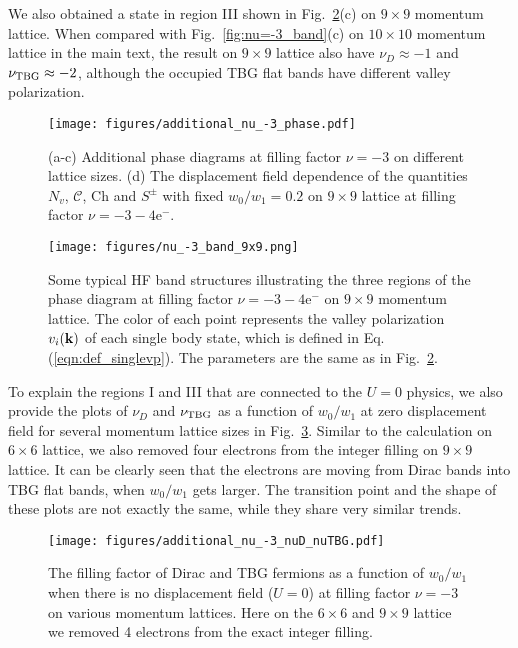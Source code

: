 \documentclass[prb,aps,nofootinbib,amssymb,twocolumn,superscriptaddress,10pt]{revtex4-2}
\begin{document}
\begin{widetext}
We also obtained a state in region III shown in Fig.~\ref{fig:additional_nu_-3_bands}(c) on $9\times 9$ momentum lattice. When compared with Fig.~\ref{fig:nu=-3_band}(c) on $10\times 10$ momentum lattice in the main text, the result on $9\times 9$ lattice also have $\nu_D \approx -1$ and $\nu_{\rm TBG} \approx -2$, although the occupied TBG flat bands have different valley polarization.

\begin{figure}[!htbp]
	\centering
	\texttt{[image: figures/additional\_nu\_-3\_phase.pdf]}
	\caption{(a-c) Additional phase diagrams at filling factor $\nu=-3$ on different lattice sizes. (d) The displacement field dependence of the quantities $N_v$, $\mathcal{C}$, $\mathrm{Ch}$ and $S^\pm$ with fixed $w_0/w_1 = 0.2$ on $9\times 9$ lattice at filling factor $\nu=-3 - 4\mathrm{e}^-$.}
	\label{app_fig:additional_nu_-3_phase}
\end{figure}

\begin{figure}[!htbp]
	\centering
	\texttt{[image: figures/nu\_-3\_band\_9x9.png]}
	\caption{Some typical HF band structures illustrating the three regions of the phase diagram at filling factor $\nu=-3 - 4\mathrm{e}^-$ on $9\times 9$ momentum lattice. The color of each point represents the valley polarization $v_i(\mathbf{k})$ of each single body state, which is defined in Eq. (\ref{eqn:def_singlevp}). The parameters are the same as in Fig.~\ref{fig:additional_nu_-3_bands}.}
	\label{fig:additional_nu_-3_bands}
\end{figure}

To explain the regions I and III that are connected to the $U=0$ physics, we also provide the plots of $\nu_D$ and $\nu_{\rm TBG}$ as a function of $w_0/w_1$ at zero displacement field for several momentum lattice sizes in Fig.~\ref{app_fig:addtional_nuD_nuTBG}. Similar to the calculation on $6\times 6$ lattice, we also removed four electrons from the integer filling on $9\times 9$ lattice. It can be clearly seen that the electrons are moving from Dirac bands into TBG flat bands, when $w_0/w_1$ gets larger. The transition point and the shape of these plots are not exactly the same, while they share very similar trends. 

\begin{figure}[!htbp]
	\centering
	\texttt{[image: figures/additional\_nu\_-3\_nuD\_nuTBG.pdf]}
	\caption{The filling factor of Dirac and TBG fermions as a function of $w_0/w_1$ when there is no displacement field ($U=0$) at filling factor $\nu=-3$ on various momentum lattices. Here on the $6\times 6$ and $9\times 9$ lattice we removed 4 electrons from the exact integer filling.}
	\label{app_fig:addtional_nuD_nuTBG}
\end{figure}


\end{widetext}
\end{document}
